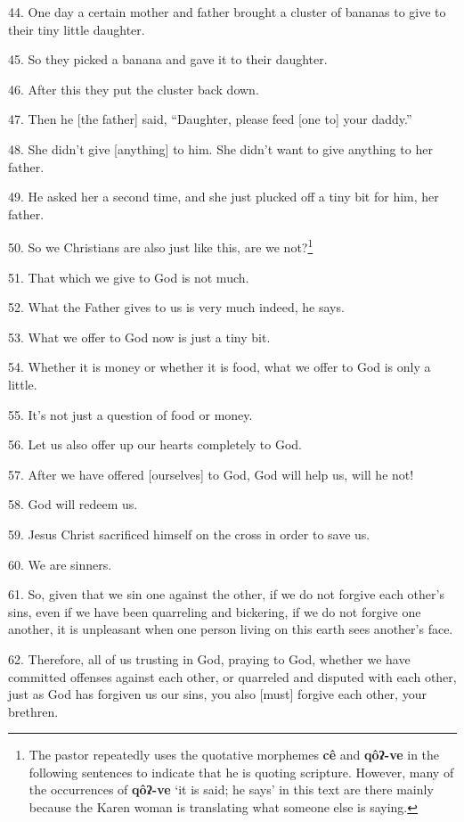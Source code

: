 44. One day a certain mother and father brought a cluster of bananas to give to
their tiny little daughter.

45. So they picked a banana and gave it to their daughter.

46. After this they put the cluster back down.

47. Then he [the father] said, ``Daughter, please feed [one to] your daddy.''

48. She didn't give [anything] to him. She didn't want to give anything to her
father.

49. He asked her a second time, and she just plucked off a tiny bit for him, her
father.

50. So we Christians are also just like this, are we not?\footnote{The pastor repeatedly uses the quotative morphemes \textbf{cê} and \textbf{qôʔ-ve} in the following sentences to indicate that he is quoting scripture. However, many of the occurrences of \textbf{qôʔ-ve} `it is said; he says' in this text are there mainly because the Karen woman is translating what someone else is saying.}

51. That which we give to God is not much.

52. What the Father gives to us is very much indeed, he says.

53. What we offer to God now is just a tiny bit.

54. Whether it is money or whether it is food, what we offer to God is only a little.

55. It's not just a question of food or money.

56. Let us also offer up our hearts completely to God.

57. After we have offered [ourselves] to God, God will help us, will he not!

58. God will redeem us.

59. Jesus Christ sacrificed himself on the cross in order to save us.

60. We are sinners.

61. So, given that we sin one against the other, if we do not forgive each other's
sins, even if we have been quarreling and bickering, if we do not forgive one another,
it is unpleasant when one person living on this earth sees another's face.

62. Therefore, all of us trusting in God, praying to God, whether we have committed
offenses against each other, or quarreled and disputed with each other, just as
God has forgiven us our sins, you also [must] forgive each other, your brethren.

